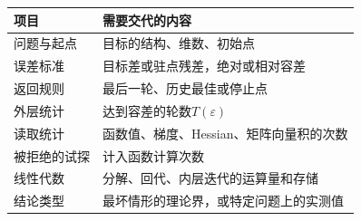 \begin{BookInlineTable}
  \centering
  \begin{tabular}{@{}ll@{}}
    \toprule
    项目 & 需要交代的内容\\
    \midrule
    问题与起点 & 目标的结构、维数、初始点\\
    误差标准 & 目标差或驻点残差，绝对或相对容差\\
    返回规则 & 最后一轮、历史最佳或停止点\\
    外层统计 & 达到容差的轮数$T(\varepsilon)$\\
    读取统计 & 函数值、梯度、Hessian、矩阵向量积的次数\\
    被拒绝的试探 & 计入函数计算次数\\
    线性代数 & 分解、回代、内层迭代的运算量和存储\\
    结论类型 & 最坏情形的理论界，或特定问题上的实测值\\
    \bottomrule
  \end{tabular}
  \caption{比较优化算法时的报告项目。同一项目口径不同的两组结果不能直接比较。}
  \label{tab:smooth-report}
\end{BookInlineTable}
